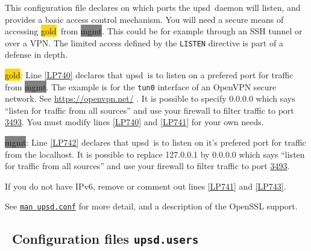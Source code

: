 \documentclass[12pt]{article}
\newlength{\headersep}\setlength{\headersep}{3mm}
\newcommand{\Hsep}{\hspace{\headersep}}
\newcommand{\upsd}{\mbox{\textcolor{UPSDCOLOUR}{upsd}}}
\newcommand{\gold}[1][gold]{\colorbox{GOLD}{#1}}
\newcommand{\mgmt}[1][mgmt]{\colorbox{GRAY}{#1}}
\newcommand{\upsdusers}{\textcolor{UPSDCOLOUR}{\texttt{upsd.users}}}
\newcommand{\IANAnut}{\href{https://www.iana.org/assignments/service-names-port-numbers/service-names-port-numbers.xhtml?search=3493}%
                           {3493}}
\newcommand{\NUTman}[1]{\href{https://networkupstools.org/docs/man/#1.html}{\texttt{man #1}}}
\begin{document}
This configuration file declares on which ports the \upsd\ daemon will listen,
and provides a basic access control mechanism.  You will need a secure means
of accessing \gold\ from \mgmt.  This could be for example through an SSH
tunnel or over a VPN.  The limited access defined by the \texttt{LISTEN}
directive is part of a defense in depth.

\gold: Line \ref{LP740} declares that \upsd\ is to listen on a prefered port
for traffic from \mgmt.  The example is for the \texttt{tun0} interface of an
OpenVPN secure network.  See
\href{https://openvpn.net/}{https://{\allowbreak}openvpn.net/} .  It is
possible to specify 0.0.0.0 which says ``listen for traffic from all sources''
and use your firewall to filter traffic to port \IANAnut.  You must modify lines
\ref{LP740} and \ref{LP741} for your own needs.

\mgmt: Line \ref{LP742} declares that \upsd\ is to listen on it's prefered
port for traffic from the localhost.  It is possible to replace 127.0.0.1 by
0.0.0.0 which says ``listen for traffic from all sources'' and use your
firewall to filter traffic to port \IANAnut.

If you do not have IPv6, remove or comment out lines \ref{LP741} and
\ref{LP743}.

See \NUTman{upsd.conf} for more detail, and a description of the OpenSSL
support.


\subsection{\Hsep\ Configuration files \upsdusers}\label{section:upsdusers.big}
\end{document}
